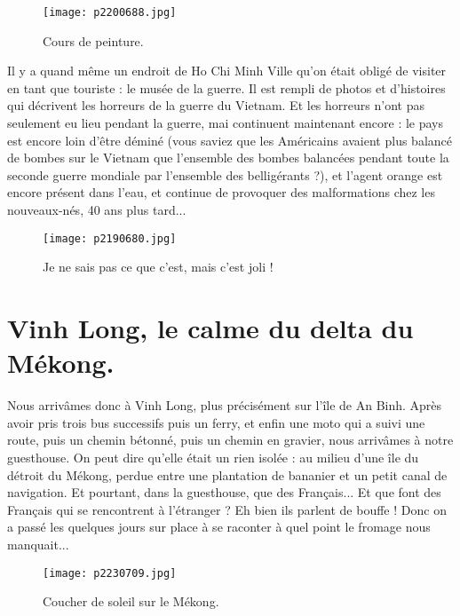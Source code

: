 \documentclass{book}
\begin{document}
\begin{figure}[h]
\centering
\texttt{[image: p2200688.jpg]}
\caption*{Cours de peinture.}
\end{figure}

Il y a quand même un endroit de Ho Chi Minh Ville qu'on était obligé de visiter en tant que touriste : le musée de la guerre. Il est rempli de photos et d'histoires qui décrivent les horreurs de la guerre du Vietnam. Et les horreurs n'ont pas seulement eu lieu pendant la guerre, mai continuent maintenant encore : le pays est encore loin d'être déminé (vous saviez que les Américains avaient plus balancé de bombes sur le Vietnam que l'ensemble des bombes balancées pendant toute la seconde guerre mondiale par l'ensemble des belligérants ?), et l'agent orange est encore présent dans l'eau, et continue de provoquer des malformations chez les nouveaux-nés, 40 ans plus tard...




\begin{figure}[h]
\centering
\texttt{[image: p2190680.jpg]}
\caption*{Je ne sais pas ce que c'est, mais c'est joli !}
\end{figure}







\chapter{Vinh Long, le calme du delta du Mékong.}
Nous arrivâmes donc à Vinh Long, plus précisément sur l'île de An Binh. Après avoir pris trois bus successifs puis un ferry, et enfin une moto qui a suivi une route, puis un chemin bétonné, puis un chemin en gravier, nous arrivâmes à notre guesthouse. On peut dire qu'elle était un rien isolée : au milieu d'une île du détroit du Mékong, perdue entre une plantation de bananier et un petit canal de navigation. Et pourtant, dans la guesthouse, que des Français... Et que font des Français qui se rencontrent à l'étranger ? Eh bien ils parlent de bouffe ! Donc on a passé les quelques jours sur place à se raconter à quel point le fromage nous manquait...


\begin{figure}[h]
\centering
\texttt{[image: p2230709.jpg]}
\caption*{Coucher de soleil sur le Mékong.}
\end{figure}
\end{document}
